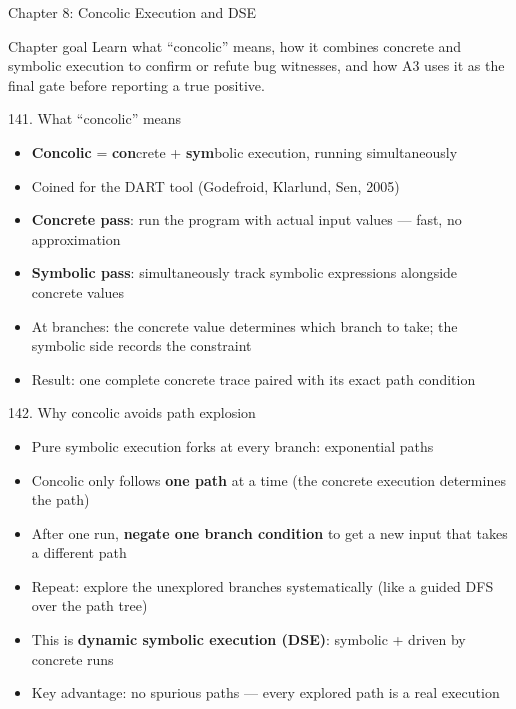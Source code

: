 \documentclass[aspectratio=169]{beamer}
\begin{document}
\begin{frame}{Chapter 8: Concolic Execution and DSE}
\begin{block}{Chapter goal}
Learn what ``concolic'' means, how it combines concrete and symbolic execution to confirm or
refute bug witnesses, and how A3 uses it as the final gate before reporting a true positive.
\end{block}
\end{frame}

\begin{frame}{141. What ``concolic'' means}
\begin{itemize}
  \item \textbf{Concolic} = \textbf{con}crete + \textbf{sym}bolic execution, running simultaneously
  \item Coined for the DART tool (Godefroid, Klarlund, Sen, 2005)
  \item \textbf{Concrete pass}: run the program with actual input values --- fast, no approximation
  \item \textbf{Symbolic pass}: simultaneously track symbolic expressions alongside concrete values
  \item At branches: the concrete value determines which branch to take; the symbolic side records the constraint
  \item Result: one complete concrete trace paired with its exact path condition
\end{itemize}
\end{frame}

\begin{frame}{142. Why concolic avoids path explosion}
\begin{itemize}
  \item Pure symbolic execution forks at every branch: exponential paths
  \item Concolic only follows \textbf{one path} at a time (the concrete execution determines the path)
  \item After one run, \textbf{negate one branch condition} to get a new input that takes a different path
  \item Repeat: explore the unexplored branches systematically (like a guided DFS over the path tree)
  \item This is \textbf{dynamic symbolic execution (DSE)}: symbolic + driven by concrete runs
  \item Key advantage: no spurious paths --- every explored path is a real execution
\end{itemize}
\end{frame}
\end{document}

